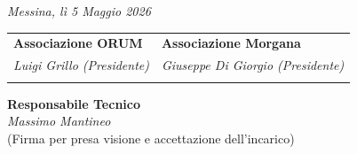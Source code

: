 \documentclass[a4paper,11pt]{article}
\begin{document}
\textit{Messina, lì 5 Maggio 2026}

\vspace{1.5cm}

\noindent
\begin{tabular}{@{}p{} p{}@{}}
    \textbf{Associazione ORUM} & \textbf{Associazione Morgana} \\
    \textit{Luigi Grillo (Presidente)} & \textit{Giuseppe Di Giorgio (Presidente)} \\
    \vspace{1cm} \hrulefill & \vspace{1cm} \hrulefill \\
\end{tabular}

\vspace{1.5cm}

\begin{center}
    \textbf{Responsabile Tecnico} \\
    \textit{Massimo Mantineo} \\
    (Firma per presa visione e accettazione dell'incarico) \\
    \vspace{1.5cm}
    \makebox[8cm]{\hrulefill}
\end{center}
\end{document}
